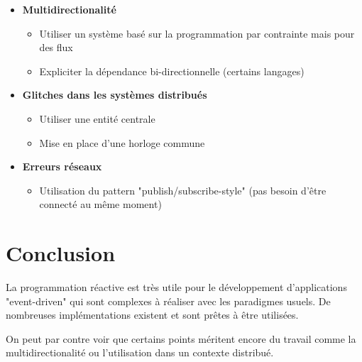 \documentclass[10pt,final]{IEEEtran}
\begin{document}
\begin{itemize}
    \item \textbf{Multidirectionalité}
        \begin{itemize}
            \item Utiliser un système basé sur la programmation par contrainte mais pour des flux
            \item Expliciter la dépendance bi-directionnelle (certains langages)
        \end{itemize}
    \item \textbf{Glitches dans les systèmes distribués}
        \begin{itemize}
            \item Utiliser une entité centrale
            \item Mise en place d'une horloge commune
        \end{itemize}
    \item \textbf{Erreurs réseaux}
        \begin{itemize}
            \item Utilisation du pattern "publish/subscribe-style" (pas besoin d'être connecté au même moment)
        \end{itemize}
\end{itemize}

\section{Conclusion}

La programmation réactive est très utile pour le développement d'applications "event-driven" qui sont complexes à réaliser avec les paradigmes usuels. De nombreuses implémentations existent et sont prêtes à être utilisées.

On peut par contre voir que certains points méritent encore du travail comme la multidirectionalité ou l'utilisation dans un contexte distribué.
\end{document}
